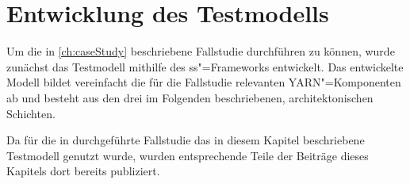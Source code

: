 \chapter{Entwicklung des Testmodells}
\label{ch:model}

Um die in \cref{ch:caseStudy} beschriebene Fallstudie durchführen zu können, wurde zunächst das Testmodell mithilfe des \gls{ss}"=Frameworks entwickelt.
Das entwickelte Modell bildet vereinfacht die für die Fallstudie relevanten YARN"=Komponenten ab und besteht aus den drei im Folgenden beschriebenen, architektonischen Schichten.

Da für die in \cite{Eberhardinger2018} durchgeführte Fallstudie das in diesem Kapitel beschriebene Testmodell genutzt wurde, wurden entsprechende Teile der Beiträge dieses Kapitels dort bereits publiziert.








